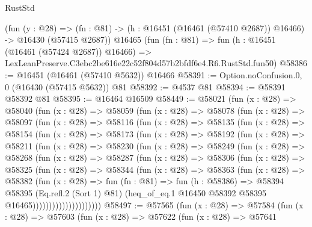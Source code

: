 \begin{lexlean}{RustStd}
\begin{coremodule}
    (fun (y : @28) =>
    (fn : @81) -> (h : @16451 (@16461 (@57410 @2687)) @16466) -> @16430 (@57415 @2687))
    @16465
    (fun (fn : @81) =>
    fun (h : @16451 (@16461 (@57424 @2687)) @16466) =>
    LexLeanPreserve.C3ebc2be616e22c52f804d57b2bfdf6e4.R6.RustStd.fun50)
@58386 := @16451 (@16461 (@57410 @5632)) @16466
@58391 := Option.noConfusion.{0, 0} (@16430 (@57415 @5632)) @81
@58392 := @4537 @81
@58394 := @58391 @58392 @81
@58395 := @16464 @16509
@58449 := @58021
    (fun (x : @28) =>
    @58040
      (fun (x : @28) =>
      @58059
        (fun (x : @28) =>
        @58078
          (fun (x : @28) =>
          @58097
            (fun (x : @28) =>
            @58116
              (fun (x : @28) =>
              @58135
                (fun (x : @28) =>
                @58154
                  (fun (x : @28) =>
                  @58173
                    (fun (x : @28) =>
                    @58192
                      (fun (x : @28) =>
                      @58211
                        (fun (x : @28) =>
                        @58230
                          (fun (x : @28) =>
                          @58249
                            (fun (x : @28) =>
                            @58268
                              (fun (x : @28) =>
                              @58287
                                (fun (x : @28) =>
                                @58306
                                  (fun (x : @28) =>
                                  @58325
                                    (fun (x : @28) =>
                                    @58344
                                      (fun (x : @28) =>
                                      @58363
                                        (fun (x : @28) =>
                                        @58382
                                          (fun (x : @28) =>
                                          fun (fn : @81) =>
                                          fun (h : @58386) =>
                                          @58394
                                            @58395
                                            (Eq.refl.{2} (Sort 1) @81)
                                            (heq_of_eq.{1}
                                              @16450
                                              @58392
                                              @58395
                                              @16465)))))))))))))))))))))
@58497 := @57565
    (fun (x : @28) =>
    @57584
      (fun (x : @28) =>
      @57603
        (fun (x : @28) =>
        @57622
          (fun (x : @28) =>
          @57641

\end{coremodule}
\end{lexlean}
